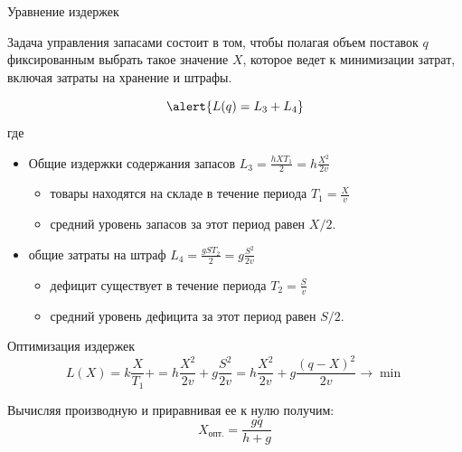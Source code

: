\documentclass[unicode,11pt,notheorems,xcolor=table]{beamer}
\begin{document}
\begin{frame}{Уравнение издержек}{}
    \begin{block}{}
     Задача управления запасами состоит в том, чтобы полагая объем поставок $q$ фиксированным выбрать такое значение $X$, которое ведет к минимизации затрат, включая затраты на хранение и штрафы.
    \end{block}

    $$
        \alert{L(q) =L_3  + L_4}
    $$
    где
    \begin{itemize}

        \item  Общие издержки содержания запасов $L_3 = \frac{hXT_1}{2} = h\frac{X^2}{2v}$
        \begin{itemize}
            \item товары находятся на складе в течение периода $T_1=\frac{X}{v}$
            \item средний уровень запасов за этот период равен $X/2$. 
        \end{itemize}    
        \item  общие затраты на штраф $L_4 = \frac{gST_2}{2} = g\frac{S^2}{2v}$
        \begin{itemize}
            \item дефицит существует в течение периода $T_2=\frac{S}{v}$
            \item средний уровень дефицита за этот период равен $S/2$. 
        \end{itemize}    
   \end{itemize}    
\end{frame}

\begin{frame}{Оптимизация издержек}{}
    $$
        L(X)  = k\frac{X}{T_1} + 
        = h\frac{X^2}{2v} + g\frac{S^2}{2v} 
        =  h\frac{X^2}{2v} + g\frac{(q-X)^2}{2v}  \to \min
    $$
    
    Вычисляя производную и приравнивая ее к нулю
    получим:
    $$
    X_\text{опт.} = \frac{gq}{h+g}
    $$
\end{frame}
\end{document}
